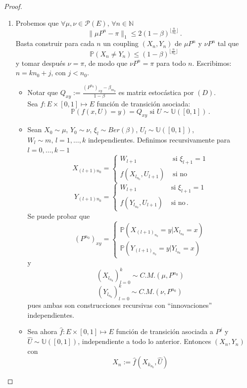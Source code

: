 \documentclass[letterpaper,11pt]{article} %
\theoremstyle{defbreak}
\theoremstyle{propbreak}
\theoremstyle{remark}
\theoremstyle{break}
\def\P{\mathbb{P}}
\def\N{\mathbb{N}}
\def\unif{\mathbb{U}([0,1])}
\def\beforeitemize{\leavevmode \vspace{-0.5\baselineskip}}
\def\gris{\color{mygray}}
\begin{document}
\begin{proof} %
\gris
\beforeitemize
\begin{enumerate}
    \item Probemos que $\forall\mu,\nu\in\mathcal{P}(E),\,\forall n\in\N$
    $$ \|\mu P^n-\pi\|_1\leq 2(1-\beta)^{\lfloor\frac{n}{n_0}\rfloor} \, .$$
    Basta construir para cada $n$ un coupling $(X_n,Y_n)$ de $\mu P^n$ y $\nu P^n$ tal que
    $$ \P(X_n\neq Y_n)\leq(1-\beta)^{\lfloor\frac{n}{n_0}\rfloor} \, $$
    y tomar despu\'es $\nu=\pi$, de modo que $\nu P^n=\pi$ para todo $n$.  
    Escribimos: $n=k n_0+j$, con $j<n_0$.
    \begin{itemize}
        \item Notar que $Q_{xy}:=\displaystyle\frac{(P^{n_0})_{xy}-\beta_{m_y}}{1-\beta}$ es matriz estocástica por $(D)$.
        \\ Sea $f:E\times[0,1]\mapsto E$ función de transición asociada:
        $$ \P(f(x,U)=y)=Q_{xy}\text{ si }U\sim\unif\,.$$
        \item Sean $X_0\sim\mu$, $Y_0\sim \nu$, $\xi_l\sim Ber(\beta)$, $U_l\sim\unif$, $W_l\sim m, \, l=1,\dots,k$ independientes. Definimos recursivamente para $l=0,\dots,k-1$
        $$X_{(l+1)n_0} = \begin{cases}
                W_{l+1} & \mbox{ si }\xi_{l+1}=1\\
                f(X_{l_{n_0}},U_{l+1}) & \mbox{ si no}
            \end{cases}$$
        $$Y_{(l+1)n_0} = \begin{cases}
                W_{l+1} & \mbox{ si }\xi_{l+1}=1\\
                f(Y_{l_{n_0}},U_{l+1}) & \mbox{ si no} \, .
            \end{cases}$$
        Se puede probar que
        $$ (P^{n_0})_{xy} = \begin{cases}
                \P(X_{(l+1)_{n_0}}=y|X_{l_{n_0}}=x) \\
                \P(Y_{(l+1)_{n_0}}=y|Y_{l_{n_0}}=x)
            \end{cases} $$
        y $$ (X_{l_{n_0}})^k_{l=0}\sim C.M.(\mu,P^{n_0})$$
        $$ (Y_{l_{n_0}})^k_{l=0}\sim C.M.(\nu,P^{n_0})\,$$
        pues ambas son construcciones recursivas con ``innovaciones'' independientes.
        \item Sea ahora $\hat{f}:E\times[0,1]\mapsto E$ función de transición asociada a $P^j$ y $\hat{U}\sim\unif$, independiente a todo lo anterior. Entonces $(X_n,Y_n)$ con
        $$ X_n := \hat{f}(X_{k_{n_0}},\hat{U})$$

\end{itemize}
\end{enumerate}
\end{proof}
\end{document}
